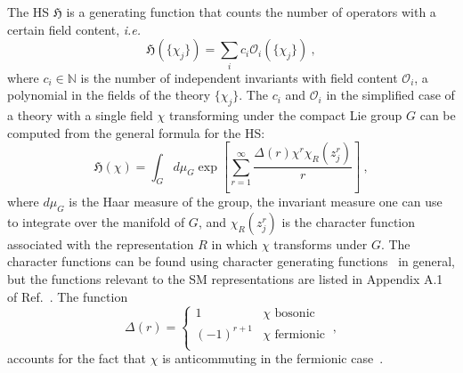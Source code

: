 The HS $\mathfrak{H}$ is a generating function that counts the number of
operators with a certain field content, \textit{i.e.}
\begin{equation}
  \mathfrak{H}(\{\chi_{j}\}) = \sum_{i} c_{i} \mathcal{O}_{i}(\{\chi_{j}\}) \ ,
\end{equation}
where $c_{i} \in \mathbb{N}$ is the number of independent invariants with field
content $\mathcal{O}_{i}$, a polynomial in the fields of the theory
$\{\chi_{j}\}$. The $c_{i}$ and $\mathcal{O}_{i}$ in the simplified case of a
theory with a single field $\chi$ transforming under the compact Lie group $G$
can be computed from the general formula for the HS:
\begin{equation}
  \label{eq:ch1-hs-g}
  \mathfrak{H}(\chi) = \int_{G} d\mu_{G} \exp \left[ \sum_{r=1}^{\infty} \frac{\Delta(r) \chi^{r} \chi_{R}(z_{j}^{r})}{r} \right] \ ,
\end{equation}
where $d\mu_{G}$ is the Haar measure of the group, the invariant measure one can
use to integrate over the manifold of $G$, and $\chi_{R}(z_{j}^{r})$ is the
character function associated with the representation $R$ in which $\chi$
transforms under $G$. The character functions can be found using character
generating functions~\cite{Hanany:2014dia} in general, but the functions
relevant to the SM representations are listed in Appendix A.1 of
Ref.~\cite{Lehman:2015via}. The function
\begin{equation}
  \Delta(r) = \begin{cases}
    1 & \text{$\chi$ bosonic} \\
    (-1)^{r+1} & \text{$\chi$ fermionic} \\
  \end{cases} \ ,
\end{equation}
accounts for the fact that $\chi$ is anticommuting in the fermionic
case~\cite{Hanany:2014dia}.

